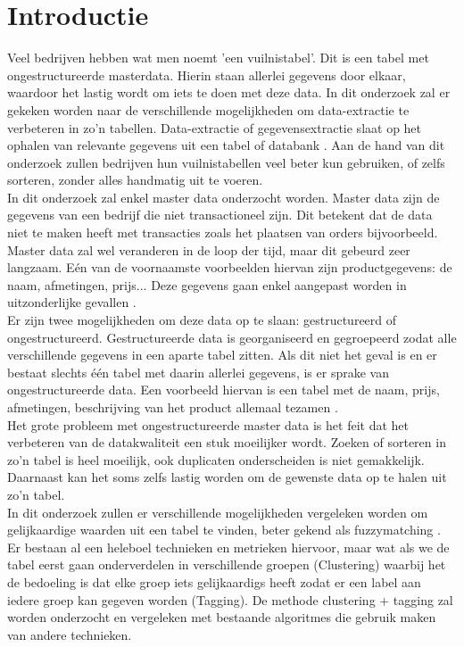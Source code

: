 
\section{Introductie}%
\label{sec:introductie}
Veel bedrijven hebben wat men noemt 'een vuilnistabel'. Dit is een tabel met ongestructureerde masterdata. Hierin staan allerlei gegevens door elkaar, waardoor het lastig wordt om iets te doen met deze data. In dit onderzoek zal er gekeken worden naar de verschillende mogelijkheden om data-extractie te verbeteren in zo'n tabellen. Data-extractie of gegevensextractie slaat op het ophalen van relevante gegevens uit een tabel of databank \autocite{Encyclo.nl}. Aan de hand van dit onderzoek zullen bedrijven hun vuilnistabellen veel beter kun gebruiken, of zelfs sorteren, zonder alles handmatig uit te voeren.
\\\indent
In dit onderzoek zal enkel master data onderzocht worden. Master data zijn de gegevens van een bedrijf die niet transactioneel zijn. Dit betekent dat de data niet te maken heeft met transacties zoals het plaatsen van orders bijvoorbeeld. Master data zal wel veranderen in de loop der tijd, maar dit gebeurd zeer langzaam. Eén van de voornaamste voorbeelden hiervan zijn productgegevens: de naam, afmetingen, prijs... Deze gegevens gaan enkel aangepast worden in uitzonderlijke gevallen \autocite{Yellowground}.
\\\indent
Er zijn twee mogelijkheden om deze data op te slaan: gestructureerd of ongestructureerd. Gestructureerde data is georganiseerd en gegroepeerd zodat alle verschillende gegevens in een aparte tabel zitten. Als dit niet het geval is en er bestaat slechts één tabel met daarin allerlei gegevens, is er sprake van ongestructureerde data. Een voorbeeld hiervan is een tabel met de naam, prijs, afmetingen, beschrijving van het product allemaal tezamen \autocite{Seagate}.
\\\indent
Het grote probleem met ongestructureerde master data is het feit dat het verbeteren van de datakwaliteit een stuk moeilijker wordt. Zoeken of sorteren in zo'n tabel is heel moeilijk, ook duplicaten onderscheiden is niet gemakkelijk. Daarnaast kan het soms zelfs lastig worden om de gewenste data op te halen uit zo'n tabel.
\\\indent
In dit onderzoek zullen er verschillende mogelijkheden vergeleken worden om gelijkaardige waarden uit een tabel te vinden, beter gekend als fuzzymatching \autocite{Silva2022}. Er bestaan al een heleboel technieken en metrieken hiervoor, maar wat als we de tabel eerst gaan onderverdelen in verschillende groepen (Clustering) waarbij het de bedoeling is dat elke groep iets gelijkaardigs heeft zodat er een label aan iedere groep kan gegeven worden (Tagging). De methode clustering + tagging zal worden onderzocht en vergeleken met bestaande algoritmes die gebruik maken van andere technieken.
